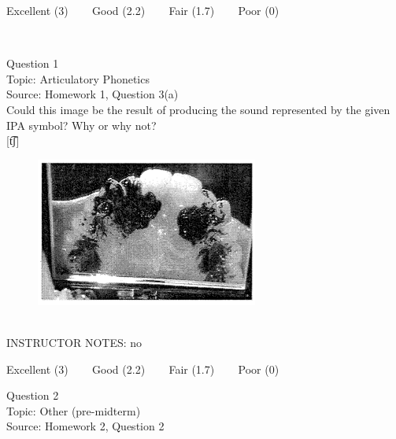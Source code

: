\documentclass[12pt]{article}
\begin{document}
\vfill
Excellent (3) ~~~ Good (2.2) ~~~ Fair (1.7) ~~~ Poor (0)
\newpage

\begin{center}
\textbf{{\color{red}{\HUGE END OF EXAM}}}\\

\end{center}
\newpage

\begin{center}
\textbf{{\color{blue}{\HUGE START OF EXAM\\}}}

\textbf{{\color{blue}{\HUGE Student ID: 38755\\}}}

\textbf{{\color{blue}{\HUGE 9:50\\}}}

\end{center}
\newpage

{\large Question 1}\\

Topic: Articulatory Phonetics\\
Source: Homework 1, Question 3(a)\\

Could this image be the result of producing the sound represented by the given IPA symbol? Why or why not?\\

{[t͡ʃ]}

\begin{figure}[H]
\includegraphics{../images/staticpalatography_fricative.png}
\end{figure}

~\\
INSTRUCTOR NOTES: no


\vfill
Excellent (3) ~~~ Good (2.2) ~~~ Fair (1.7) ~~~ Poor (0)
\newpage

{\large Question 2}\\

Topic: Other (pre-midterm)\\
Source: Homework 2, Question 2\\
\end{document}
